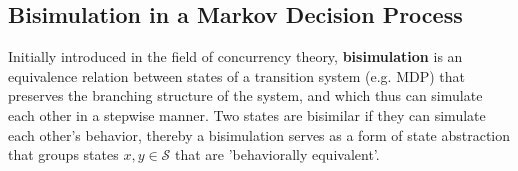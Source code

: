 



\subsection{Bisimulation in a Markov Decision Process}
Initially introduced in the field of concurrency theory, \textbf{bisimulation} \cite{li2006towards, abate2024bisimulation, baier2008principles} is an equivalence relation between states of a transition system (e.g. MDP) that preserves the branching structure of the system, and which thus can simulate each other in a stepwise manner. Two states are bisimilar if they can simulate each other's behavior, thereby a bisimulation serves as a form of state abstraction that groups states $x, y \in \mathcal{S}$  that are 'behaviorally equivalent'. 


